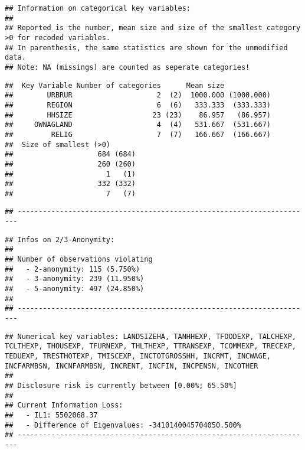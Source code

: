 \documentclass[
]{book}
\theoremstyle{definition}
\theoremstyle{definition}
\theoremstyle{definition}
\theoremstyle{definition}
\theoremstyle{remark}
\begin{document}
\begin{verbatim}
## Information on categorical key variables:
## 
## Reported is the number, mean size and size of the smallest category >0 for recoded variables.
## In parenthesis, the same statistics are shown for the unmodified data.
## Note: NA (missings) are counted as seperate categories!
\end{verbatim}

\begin{verbatim}
##  Key Variable Number of categories      Mean size           
##        URBRUR                    2  (2)  1000.000 (1000.000)
##        REGION                    6  (6)   333.333  (333.333)
##        HHSIZE                   23 (23)    86.957   (86.957)
##     OWNAGLAND                    4  (4)   531.667  (531.667)
##         RELIG                    7  (7)   166.667  (166.667)
##  Size of smallest (>0)      
##                    684 (684)
##                    260 (260)
##                      1   (1)
##                    332 (332)
##                      7   (7)
\end{verbatim}

\begin{verbatim}
## ----------------------------------------------------------------------
\end{verbatim}

\begin{verbatim}
## Infos on 2/3-Anonymity:
## 
## Number of observations violating
##   - 2-anonymity: 115 (5.750%)
##   - 3-anonymity: 239 (11.950%)
##   - 5-anonymity: 497 (24.850%)
## 
## ----------------------------------------------------------------------
\end{verbatim}

\begin{verbatim}
## Numerical key variables: LANDSIZEHA, TANHHEXP, TFOODEXP, TALCHEXP, TCLTHEXP, THOUSEXP, TFURNEXP, THLTHEXP, TTRANSEXP, TCOMMEXP, TRECEXP, TEDUEXP, TRESTHOTEXP, TMISCEXP, INCTOTGROSSHH, INCRMT, INCWAGE, INCFARMBSN, INCNFARMBSN, INCRENT, INCFIN, INCPENSN, INCOTHER
## 
## Disclosure risk is currently between [0.00%; 65.50%]
## 
## Current Information Loss:
##   - IL1: 5502068.37
##   - Difference of Eigenvalues: -3410140045704050.500%
## ----------------------------------------------------------------------
\end{verbatim}
\end{document}
